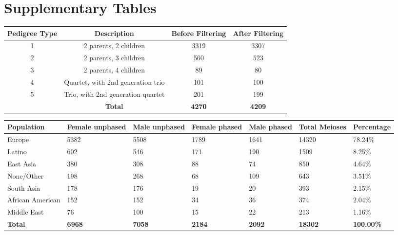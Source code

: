 \clearpage
\section{Supplementary Tables}

\vspace{3cm}
\begin{table}[!h] \centering
    \begin{tabular}{|cccc|} 
        \hline Pedigree Type & Description & Before Filtering & After Filtering \\ \hline
        1 & 2 parents, 2 children & 3319 & 3307 \\
        2 & 2 parents, 3 children & 560 & 523 \\
        3 & 2 parents, 4 children & 89 & 80 \\
        4 & Quartet, with 2nd generation trio & 101 & 100 \\
        5 & Trio, with 2nd generation quartet & 201 & 199 \\
        \hline & \textbf{Total} & \textbf{4270} & \textbf{4209} \\
    \hline \end{tabular}
\end{table}

\vspace{3cm}
\begin{table}[!h] \centering
    \begin{tabular}{|p{3cm}p{1.5cm}p{1.5cm}p{1.5cm}p{1.5cm}p{1.5cm}p{1.6cm}|}
        \hline 
    Population & Female \mbox{unphased} & Male \mbox{unphased} & Female phased & Male phased & Total Meioses & Percentage \\ \hline
    Europe & 5382 & 5508 & 1789 & 1641 & 14320 & 78.24\% \\
    Latino & 602 & 546 & 171 & 190 & 1509 & 8.25\% \\
    East Asia & 380 & 308 & 88 & 74 & 850 & 4.64\% \\
    None/Other & 198 & 268 & 68 & 109 & 643 & 3.51\% \\
    South Asia & 178 & 176 & 19 & 20 & 393 & 2.15\% \\
    African American & 152 & 152 & 34 & 36 & 374 & 2.04\% \\
    Middle East & 76 & 100 & 15 & 22 & 213 & 1.16\% \\
    \hline \textbf{Total} & \textbf{6968} & \textbf{7058} & \textbf{2184} & \textbf{2092} & \textbf{18302} & \textbf{100.00\%} \\
    \hline \end{tabular}
     {
    \label{tab:cointTS2}}
\end{table}

